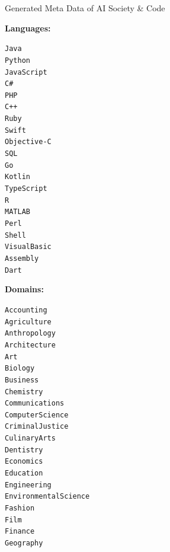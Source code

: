 \begin{figure}[h]
\begin{AIBox}{Generated Meta Data of AI Society \& Code}
{{				\parbox[t][][t]{0.22\textwidth}{{\small \bf Languages:} \scriptsize\begin{alltt}
						Java \\
						Python \\
						JavaScript \\
						C\# \\
						PHP \\
						C++ \\
						Ruby \\
						Swift \\
						Objective-C \\
						SQL \\
						Go \\
						Kotlin \\
						TypeScript \\
						R \\
						MATLAB \\
						Perl \\
						Shell \\
						Visual Basic \\
						Assembly \\
						Dart
					\end{alltt}}%
				\parbox[t][][t]{0.23\textwidth}{{\small \bf Domains:} \scriptsize\begin{alltt}
						Accounting \\
						Agriculture \\
						Anthropology \\
						Architecture \\
						Art \\
						Biology \\
						Business \\
						Chemistry \\
						Communications \\
						Computer Science \\
						Criminal Justice \\
						Culinary Arts \\
						Dentistry \\
						Economics \\
						Education \\
						Engineering \\
						Environmental Science \\
						Fashion \\
						Film \\
						Finance \\
						Geography \\

\end{alltt}}}}
\end{AIBox}
\end{figure}
